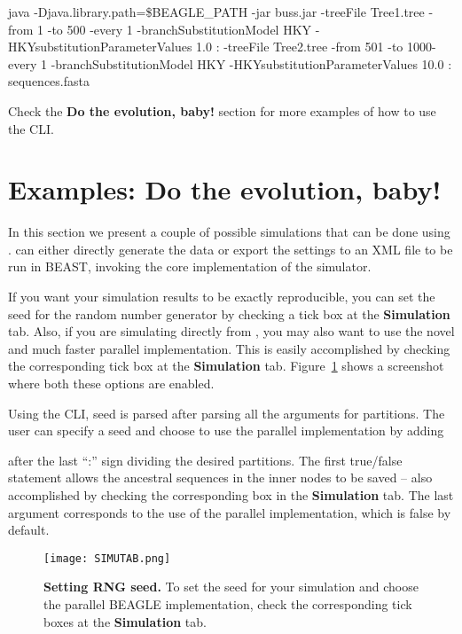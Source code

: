 \begin{code}
java -Djava.library.path=\$BEAGLE\_PATH -jar buss.jar -treeFile Tree1.tree -from 1 -to 500 -every 1 -branchSubstitutionModel HKY -HKYsubstitutionParameterValues 1.0 : -treeFile Tree2.tree -from 501 -to 1000-every 1 -branchSubstitutionModel HKY -HKYsubstitutionParameterValues 10.0 : sequences.fasta
\end{code}

Check the \textbf{Do the evolution, baby!} section for more examples of how to use the CLI.

\section{Examples: Do the evolution, baby!}

In this section we present a couple of possible simulations that can be done using {\bussname}.
{\bussname} can either directly generate the data or export the settings to an XML file to be run in BEAST, invoking the core implementation of the simulator.

If you want your simulation results to be exactly reproducible, you can set the seed for the random number generator by checking a tick box at the {\bf Simulation} tab.
Also, if you are simulating directly from {\bussname}, you may also want to use the novel and much faster parallel implementation.
This is easily accomplished by checking the corresponding tick box at the {\bf Simulation} tab.
Figure~\ref{fig:simutab} shows a screenshot where both these options are enabled.

Using the CLI, seed is parsed after parsing all the arguments for partitions.
The user can specify a seed and choose to use the parallel implementation by adding 
\begin{code} %
[<output-file-name>] [<seed>] [<true|false>] [<true|false>]
\end{code}
after the last ``:'' sign dividing the desired partitions.
The first true/false statement allows the ancestral sequences in the inner nodes to  be saved -- also accomplished by checking the corresponding box in the {\bf Simulation} tab.
The last argument corresponds to the use of the parallel implementation, which is false by default. 

\begin{figure}[h!]
\centering
\texttt{[image: SIMUTAB.png]} 
\caption{
{ \footnotesize 
{\bf Setting RNG seed.}
To set the seed for your simulation and choose the parallel BEAGLE implementation, check the corresponding tick boxes at the {\bf Simulation} tab.
} %
}
\label{fig:simutab}
\end{figure}

